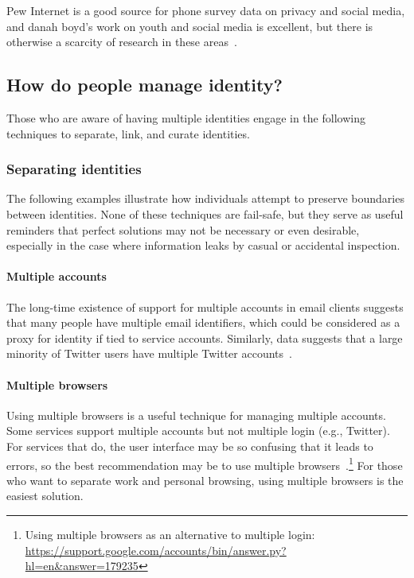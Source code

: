 \documentclass[10pt, conference, compsocconf]{IEEEtran}
\begin{document}
Pew Internet is a good source for phone survey data on privacy and social
media, and danah boyd's work on youth and social media is excellent, but there
is otherwise a scarcity of research in these areas~\cite{boyd,pew1,pew2,pew3}.

\subsection{How do people manage identity?}

Those who are aware of having multiple identities engage in the following
techniques to separate, link, and curate identities.

\subsubsection{Separating identities}

The following examples illustrate how individuals attempt to preserve boundaries
between identities. None of these techniques are fail-safe, but they serve as
useful reminders that perfect solutions may not be necessary or even desirable,
especially in the case where information leaks by casual or accidental
inspection.

\paragraph{Multiple accounts}
The long-time existence of support for multiple accounts in email clients
suggests that many people have multiple email identifiers, which could be
considered as a proxy for identity if tied to service accounts. Similarly, data
suggests that a large minority of Twitter users have multiple Twitter
accounts~\cite{twitter}.

\paragraph{Multiple browsers}

Using multiple browsers is a useful technique for managing multiple accounts.
Some services support multiple accounts but not multiple login (e.g.,
Twitter). For services that do, the user interface
may be so confusing that it leads to errors, so the best recommendation may be
to use multiple browsers~\cite{yegge}.\footnote{Using multiple
browsers as an alternative to multiple login:
\url{https://support.google.com/accounts/bin/answer.py?hl=en&answer=179235}}
For those who want to separate work and
personal browsing, using multiple browsers is the easiest solution.
\end{document}
